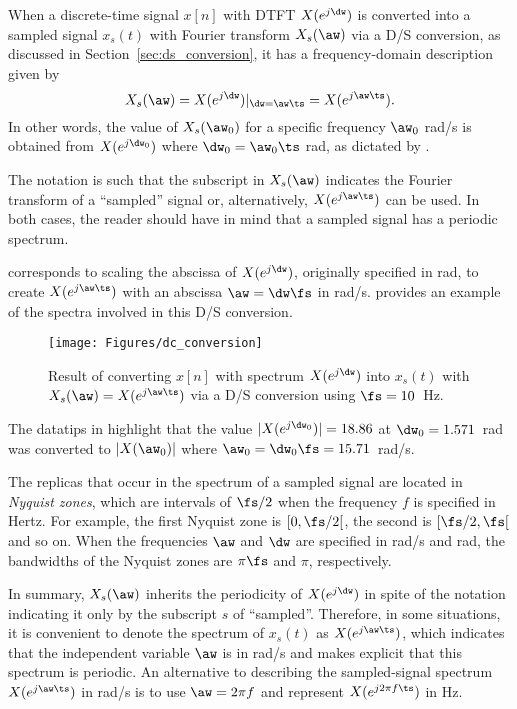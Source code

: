 When a discrete-time signal $x[n]$ with DTFT $X(e^{j \dw})$ is converted into a sampled 
signal $x_s(t)$ with Fourier transform $X_s(\aw)$ via a D/S conversion, as discussed
in Section~\ref{sec:ds_conversion}, it has a frequency-domain description given by
\begin{equation}
X_s(\aw)  = X(e^{j \dw})|_{\dw = \aw \ts} = X(e^{j \aw \ts}).
\label{eq:sampledSignalSpectrum}
\end{equation}
In other words, the value of $X_s(\aw_0)$ for a specific frequency $\aw_0$ rad/s is obtained
from $X(e^{j \dw_0})$ where $\dw_0 = \aw_0 \ts$ rad, as dictated by
 .

The notation is such that the subscript in $X_s(\aw)$  indicates the Fourier transform
of a ``sampled'' signal or, alternatively, $X(e^{j \aw \ts})$ can be used. In both
cases, the reader should have in mind that a sampled signal has a periodic spectrum.

 corresponds to scaling the abscissa of $X(e^{j \dw})$, originally
specified in rad, to create $X(e^{j \aw \ts})$ with an abscissa $\aw = \dw \fs$ in rad/s.
 provides an example of the spectra involved in this D/S conversion.

\begin{figure}
\centering
\texttt{[image: Figures/dc\_conversion]}
\caption{Result of converting $x[n]$ with spectrum $X(e^{j \dw})$ into $x_s(t)$ with $X_s(\aw)=X(e^{j \aw \ts})$ via a D/S conversion using $\fs=10$~Hz.\label{fig:dc_conversion}}
\end{figure}

The datatips in  highlight that the value $|X(e^{j \dw_0})|=18.86$ at $\dw_0=1.571$~rad was converted to $|X(\aw_0)|$ where $\aw_0=\dw_0 \fs = 15.71$~rad/s.

The replicas that occur in the spectrum of a sampled signal are located in \emph{Nyquist zones}, which are intervals of $\fs/2$ when the frequency $f$ is specified in Hertz. For example,
the first Nyquist zone is $[0, \fs/2[$, the second is $[\fs/2, \fs[$ and so on. When the frequencies
$\aw$ and $\dw$ are specified in rad/s and rad, the bandwidths of the Nyquist zones are
$\pi \fs$ and $\pi$, respectively.

In summary, $X_s(\aw)$ inherits the periodicity of $X(e^{j \dw})$ in spite of the notation indicating it
only by the subscript $s$ of ``sampled''. Therefore, in some situations, it is convenient to denote the spectrum of 
$x_s(t)$ as $X(e^{j \aw \ts})$, which indicates that the independent variable $\aw$ is in rad/s and
makes explicit that this spectrum is periodic. An alternative 
to describing the sampled-signal spectrum $X(e^{j \aw \ts})$ in rad/s is to use $\aw=2\pi f$ and
represent $X(e^{j 2 \pi f \ts})$ in Hz.

